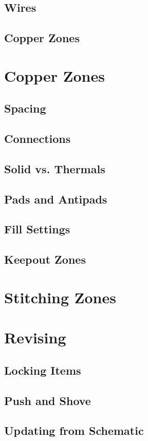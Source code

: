 \subsection{Wires}
\subsection{Copper Zones}

\section{Copper Zones}
\subsection{Spacing}
\subsection{Connections}
\subsection{Solid vs. Thermals}
\subsection{Pads and Antipads}
\subsection{Fill Settings}
\subsection{Keepout Zones}

\section{Stitching Zones}

\section{Revising}
\subsection{Locking Items}
\subsection{Push and Shove}
\subsection{Updating from Schematic}
